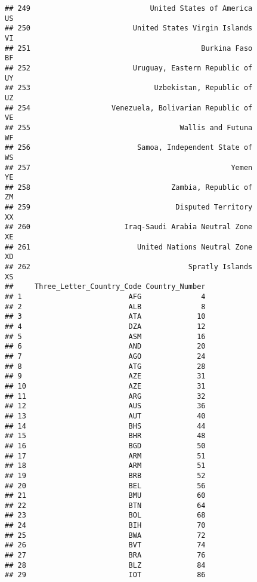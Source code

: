 \documentclass[
]{article}
\begin{document}
\begin{verbatim}
## 249                            United States of America                      US
## 250                        United States Virgin Islands                      VI
## 251                                        Burkina Faso                      BF
## 252                        Uruguay, Eastern Republic of                      UY
## 253                             Uzbekistan, Republic of                      UZ
## 254                   Venezuela, Bolivarian Republic of                      VE
## 255                                   Wallis and Futuna                      WF
## 256                         Samoa, Independent State of                      WS
## 257                                               Yemen                      YE
## 258                                 Zambia, Republic of                      ZM
## 259                                  Disputed Territory                      XX
## 260                      Iraq-Saudi Arabia Neutral Zone                      XE
## 261                         United Nations Neutral Zone                      XD
## 262                                     Spratly Islands                      XS
##     Three_Letter_Country_Code Country_Number
## 1                         AFG              4
## 2                         ALB              8
## 3                         ATA             10
## 4                         DZA             12
## 5                         ASM             16
## 6                         AND             20
## 7                         AGO             24
## 8                         ATG             28
## 9                         AZE             31
## 10                        AZE             31
## 11                        ARG             32
## 12                        AUS             36
## 13                        AUT             40
## 14                        BHS             44
## 15                        BHR             48
## 16                        BGD             50
## 17                        ARM             51
## 18                        ARM             51
## 19                        BRB             52
## 20                        BEL             56
## 21                        BMU             60
## 22                        BTN             64
## 23                        BOL             68
## 24                        BIH             70
## 25                        BWA             72
## 26                        BVT             74
## 27                        BRA             76
## 28                        BLZ             84
## 29                        IOT             86

\end{verbatim}
\end{document}
